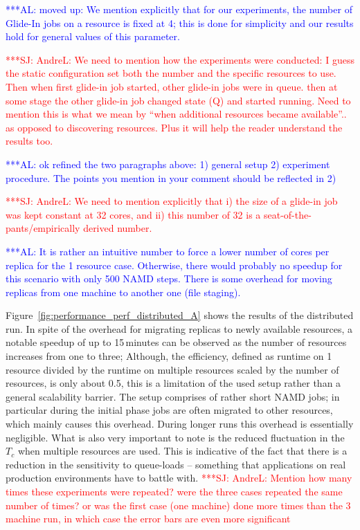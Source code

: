\documentclass{rspublic}
\newcommand{\alnote}[1]{ {\textcolor{blue} { ***AL: #1 }}}
\newcommand{\jhanote}[1]{ {\textcolor{red} { ***SJ: #1 }}}
\newcommand{\alnote}[1]{}
\newcommand{\jhanote}[1]{}
\begin{document}
\alnote{moved up: We mention explicitly that for our experiments, the
  number of Glide-In jobs on a resource is fixed at 4; this is done
  for simplicity and our results hold for general values of this
  parameter.}

\jhanote{AndreL: We need to mention how the experiments were
  conducted: I guess the static configuration set both the number and
  the specific resources to use. Then when first glide-in job started,
  other glide-in jobs were in queue. then at some stage the other
  glide-in job changed state (Q) and started running. Need to mention
  this is what we mean by ``when additional resources became
  available''.. as opposed to discovering resources. Plus it will help
  the reader understand the results too.}

\alnote{ok refined the two paragraphs above: 1) general setup 2)
  experiment procedure. The points you mention in your comment should
  be reflected in 2)}

\jhanote{AndreL: We need to mention explicitly that i) the size of a
  glide-in job was kept constant at 32 cores, and ii) this number of
  32 is a seat-of-the-pants/empirically derived number.}

\alnote{It is rather an intuitive number to force a lower number of
  cores per replica for the 1 resource case. Otherwise, there would
  probably no speedup for this scenario with only 500 NAMD
  steps. There is some overhead for moving replicas from one machine
  to another one (file staging).}

Figure~\ref{fig:performance_perf_distributed_A} shows the results of
the distributed run. In spite of the overhead for migrating replicas
to newly available resources, a notable speedup of up to 15\,minutes
can be observed as the number of resources increases from one to three;
Although, the efficiency, defined as runtime on 1 resource divided by
the runtime on multiple resources scaled by the number of resources,
is only about 0.5, this is a limitation of the used setup rather than
a general scalability barrier.  The setup comprises of rather short
NAMD jobs; in particular during the initial phase jobs are often
migrated to other resources, which mainly causes this overhead. During
longer runs this overhead is essentially negligible. What is also very
important to note is the reduced fluctuation in the $T_c$ when
multiple resources are used. This is indicative of the fact that there
is a reduction in the sensitivity to queue-loads -- something that
applications on real production environments have to battle with.
\jhanote{AndreL: Mention how many times these experiments were
  repeated? were the three cases repeated the same number of times? or
  was the first case (one machine) done more times than the 3 machine
  run, in which case the error bars are even more significant}
\end{document}

